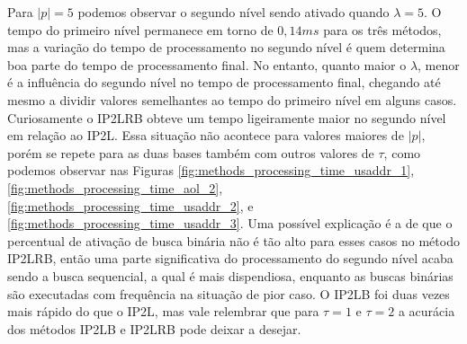 Para $|p|=5$ podemos observar o segundo nível sendo ativado quando $\lambda=5$. O tempo do primeiro nível permanece em torno de $0,14ms$ para os três métodos, mas a variação do tempo de processamento no segundo nível é quem determina boa parte do tempo de processamento final. No entanto, quanto maior o $\lambda$, menor é a influência do segundo nível no tempo de processamento final, chegando até mesmo a dividir valores semelhantes ao tempo do primeiro nível em alguns casos. Curiosamente o IP2LRB obteve um tempo ligeiramente maior no segundo nível em relação ao IP2L. Essa situação não acontece para valores maiores de $|p|$, porém se repete para as duas bases também com outros valores de $\tau$, como podemos observar nas Figuras \ref{fig:methods_processing_time_usaddr_1}, \ref{fig:methods_processing_time_aol_2}, \ref{fig:methods_processing_time_usaddr_2}, e \ref{fig:methods_processing_time_usaddr_3}. Uma possível explicação é a de que o percentual de ativação de busca binária não é tão alto para esses casos no método IP2LRB, então uma parte significativa do processamento do segundo nível acaba sendo a busca sequencial, a qual é mais dispendiosa, enquanto as buscas binárias são executadas com frequência na situação de pior caso. O IP2LB foi duas vezes mais rápido do que o IP2L, mas vale relembrar que para $\tau=1$ e $\tau=2$ a acurácia dos métodos IP2LB e IP2LRB pode deixar a desejar.


